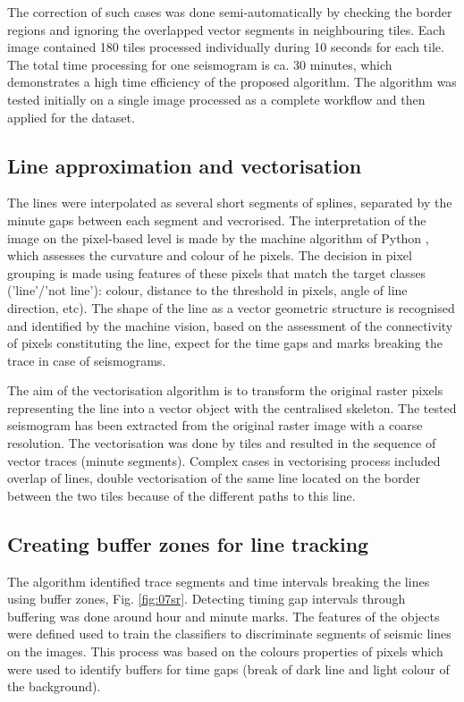 \documentclass[a4paper,english,12pt]{article}
\begin{document}
The correction of such cases was done semi-automatically by checking the border regions and ignoring the overlapped vector segments in neighbouring tiles. Each image contained 180 tiles processed individually during 10 seconds for each tile. The total time processing for one seismogram is ca. 30 minutes, which demonstrates a high time efficiency of the proposed algorithm. The algorithm was tested initially on a single image processed as a complete workflow and then applied for the dataset. 

\subsection{Line approximation and vectorisation}
The lines were interpolated as several short segments of splines, separated by the minute gaps between each segment and vecrorised. The interpretation of the image on the pixel-based level is made by the machine algorithm of Python \cite{van1995python}, which assesses the curvature and colour of he pixels. The decision in pixel grouping is made using features of these pixels that match the target classes ('line'/'not line'): colour, distance to the threshold in pixels, angle of line direction, etc). The shape of the line as a vector geometric structure is recognised and identified by the machine vision, based on the assessment of the connectivity of pixels constituting the line, expect for the time gaps and marks breaking the trace in case of seismograms. 

The aim of the vectorisation algorithm is to transform the original raster pixels representing the line into a vector object with the centralised skeleton. The tested seismogram has been extracted from the original raster image with a coarse resolution. The vectorisation was done by tiles and resulted in the sequence of vector traces (minute segments). Complex cases in vectorising process included overlap of lines, double vectorisation of the same line located on the border between the two tiles because of the different paths to this line.

\subsection{Creating buffer zones for line tracking}
The algorithm identified trace segments and time intervals breaking the lines using buffer zones, Fig. \ref{fig:07sr}. Detecting timing gap intervals through buffering was done around hour and minute marks. The features of the objects were defined used to train the classifiers to discriminate segments of seismic lines on the images. This process was based on the colours properties of pixels which were used to identify buffers for time gaps (break of dark line and light colour of the background).
\end{document}
